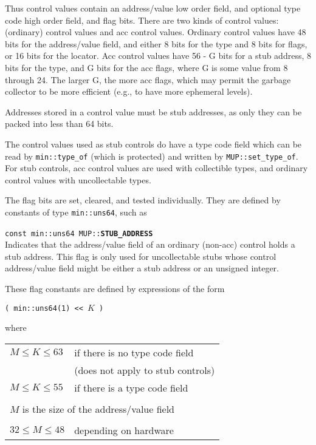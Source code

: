 \documentclass[12pt]{article}
\makeatletter
\newcommand{\ttindex}[1]{\index{#1@{\tt #1}}}
\newcommand{\MUPindex}[1]{\ttindex{MUP::#1}\ttindex{#1}}
\newenvironment{indpar}[1][0.3in]%
	{\begin{list}{}%
		     {\setlength{\itemsep}{0in}%
		      \setlength{\topsep}{0in}%
		      \setlength{\parsep}{1ex}%
		      \setlength{\labelwidth}{#1}%
		      \setlength{\leftmargin}{#1}%
		      \addtolength{\leftmargin}{\labelsep}}%
	 \item}%
	{\end{list}}
\newcommand{\LABEL}[1]{\label{#1}}
\newcommand{\MUPKEY}[1]{{\tt \bf #1}\MUPindex{#1}}
\makeatother
\begin{document}
Thus control values contain an address/value low order field, and optional
type code high order field, and flag bits.  There are two kinds of
control values: (ordinary) control values and acc control values.
Ordinary control values
have 48 bits for the address/value field, and either 8 bits for the type
and 8 bits for flags, or 16 bits for the locator.
Acc control values have 56 - G bits for a stub address, 8 bits
for the type, and G bits for the acc flags, where G is some value from 8
through 24.  The larger G, the more acc flags, which may permit the
garbage collector to be more efficient (e.g., to have more ephemeral
levels).

Addresses stored in a control value must be stub addresses, as only they
can be packed into less than 64 bits.

The control values used as stub controls do have a type code field which
can be read by \verb|min::type_of| (which is protected) and
written by \verb|MUP::set_type_of|.  For stub controls,
acc control values are used with
collectible types, and ordinary control values with
uncollectable types.

The flag bits are set, cleared, and tested individually.  They are
defined by constants of type \verb|min::uns64|, such as

\begin{indpar}
\begin{list}{}{}
\item[{\tt const min::uns64 MUP::}\MUPKEY{STUB\_ADDRESS}]~%
	\LABEL{MIN::STUB_ADDRESS}\\
Indicates that the address/value field of an ordinary (non-acc)
control holds a stub address.  This flag is only used for
uncollectable stubs whose control address/value field might
be either a stub address or an unsigned integer.
\end{list}
\end{indpar}

These flag constants are defined by expressions of the form

\begin{center}
\verb|( min::uns64(1) << |$K$\verb| )|
\end{center}

where

\begin{center}
\begin{tabular}{l@{~~~~~}l}
$M\leq K\leq 63$ & if there is no type code field \\
		 & (does not apply to stub controls) \\
$M\leq K\leq 55$ & if there is a type code field \\
\\
\multicolumn{2}{l}{$M$ is the size of the address/value field} \\
\\
$32\leq M\leq 48$ & depending on hardware \\
\end{tabular}
\end{center}
\end{document}
